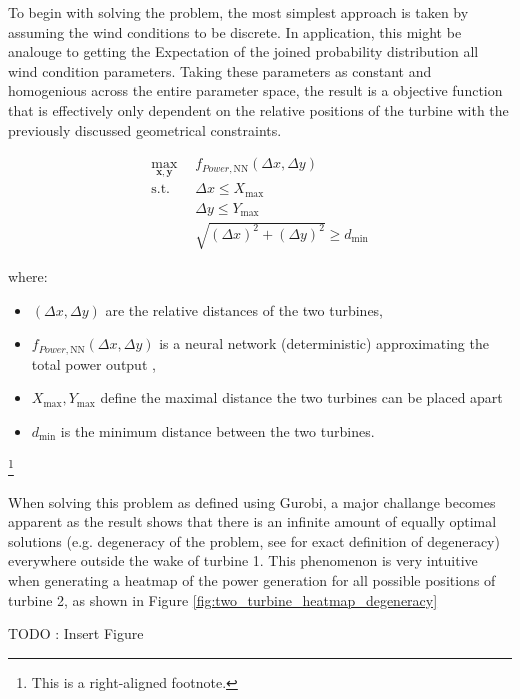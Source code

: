 To begin with solving the problem, the most simplest approach is taken by assuming the wind conditions to be discrete. In application, this might be analouge to getting the Expectation of the joined probability distribution all wind condition parameters. Taking these parameters as constant and homogenious across the entire parameter space, the result is a objective function that is effectively only dependent on the relative positions of the turbine with the previously discussed geometrical constraints.

\begin{align}
	\max_{\mathbf{x}, \mathbf{y}} & f_{Power,\text{NN}}(\Delta x, \Delta y) \\
	\text{s.t.} \quad 
	&  \Delta x \leq X_{\max} \\
	&  \Delta y \leq Y_{\max} \\
	& \sqrt{(\Delta x)^2 + (\Delta y)^2} \geq d_{\min}
\end{align}

where:
\begin{itemize}
	\item \( (\Delta x, \Delta y) \) are the relative distances of the two turbines,
	\item \( f_{Power, \text{NN}}(\Delta x, \Delta y)\) is a neural network (deterministic) approximating the total power output ,
	\item \(  X_{\max}, Y_{\max} \) define the maximal distance the two turbines can be placed apart
	\item \( d_{\min} \) is the minimum distance between the two turbines.
\end{itemize}

\footnote{This is a right-aligned footnote.}

When solving this problem as defined using Gurobi, a major challange becomes apparent as the result shows that there is an infinite amount of equally optimal solutions (e.g. degeneracy of the problem, see  \cite{vanderbei2020chapter3} for exact definition of degeneracy) everywhere outside the wake of turbine 1. This phenomenon is very intuitive when generating a heatmap of the power generation for all possible positions of turbine 2, as shown in Figure \ref{fig:two_turbine_heatmap_degeneracy}

TODO :  Insert Figure


